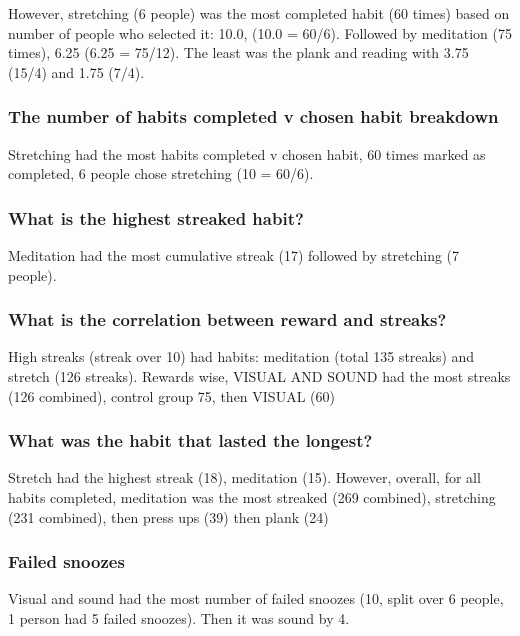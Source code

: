 However, stretching (6 people) was the most completed habit (60 times) based on number of people who selected it: 10.0, (10.0 = 60/6). Followed by meditation (75 times), 6.25 (6.25 = 75/12). The least was the plank and reading with 3.75 (15/4) and 1.75 (7/4).

\subsubsection*{The number of habits completed v chosen habit breakdown}
Stretching had the most habits completed v chosen habit, 60 times marked as completed, 6 people chose stretching (10 = 60/6).



\subsubsection*{What is the highest streaked habit?}
Meditation had the most cumulative streak (17) followed by stretching (7 people).

\subsubsection*{What is the correlation between reward and streaks?}
High streaks (streak over 10) had habits: meditation (total 135 streaks) and stretch (126 streaks). Rewards wise, VISUAL AND SOUND had the most streaks (126 combined), control group 75, then VISUAL (60)

\subsubsection*{What was the habit that lasted the longest?}
Stretch had the highest streak (18), meditation (15). However, overall, for all habits completed, meditation was the most streaked (269 combined), stretching (231 combined), then press ups (39) then plank (24)

\subsubsection*{Failed snoozes}
Visual and sound had the most number of failed snoozes (10, split over 6 people, 1 person had 5 failed snoozes). Then it was sound by 4.



